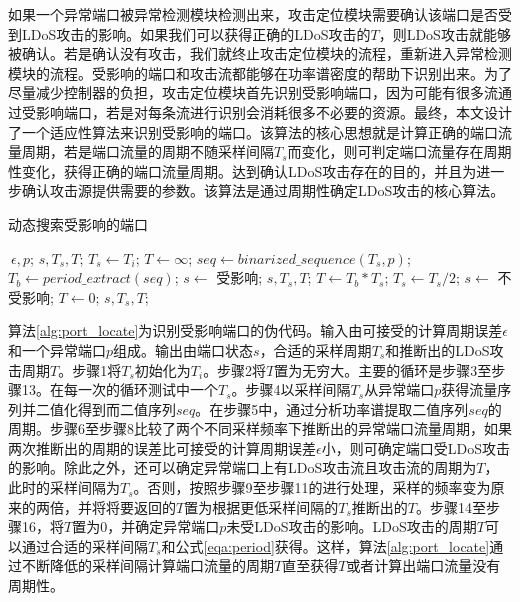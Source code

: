如果一个异常端口被异常检测模块检测出来，攻击定位模块需要确认该端口是否受到LDoS攻击的影响。如果我们可以获得正确的LDoS攻击的$T$，则LDoS攻击就能够被确认。若是确认没有攻击，我们就终止攻击定位模块的流程，重新进入异常检测模块的流程。受影响的端口和攻击流都能够在功率谱密度的帮助下识别出来。为了尽量减少控制器的负担，攻击定位模块首先识别受影响端口，因为可能有很多流通过受影响端口，若是对每条流进行识别会消耗很多不必要的资源。最终，本文设计了一个适应性算法来识别受影响的端口。该算法的核心思想就是计算正确的端口流量周期，若是端口流量的周期不随采样间隔$T_s$而变化，则可判定端口流量存在周期性变化，获得正确的端口流量周期。达到确认LDoS攻击存在的目的，并且为进一步确认攻击源提供需要的参数。该算法是通过周期性确定LDoS攻击的核心算法。

\begin{algorithm}[H]
	\caption{动态搜索受影响的端口}
	\label{alg:port_locate}
	\begin{algorithmic}[1]
		\Require $~{\epsilon}, p$;
		\Ensure $s, T_s, T$;
		\State $T_s \gets T_i$;
		\State $T \gets \infty$; 
		\State $seq \gets binarized\_sequence(T_s, p)$;
		\State $T_b \gets period\_extract(seq)$;
		\State $s \gets$ 受影响;
		\State \Return $s, T_s, T$;
		\Else
		\State $T \gets T_b * T_s$;
		\State $T_s \gets T_s / 2$;
		\EndIf 
		\EndWhile
		\State $s \gets$ 不受影响;
		\State $T \gets 0$; 
		\State \Return $s, T_s, T$;
	\end{algorithmic}
\end{algorithm}

算法\ref{alg:port_locate}为识别受影响端口的伪代码。输入由可接受的计算周期误差$\epsilon$和一个异常端口$p$组成。输出由端口状态$s$，合适的采样周期$T_s$和推断出的LDoS攻击周期$T$。步骤1将$T_s$初始化为$T_i$。步骤2将$T$置为无穷大。主要的循环是步骤3至步骤13。在每一次的循环测试中一个$T_s$。步骤4以采样间隔$T_s$从异常端口$p$获得流量序列并二值化得到而二值序列$seq$。在步骤5中，通过分析功率谱提取二值序列$seq$的周期。步骤6至步骤8比较了两个不同采样频率下推断出的异常端口流量周期，如果两次推断出的周期的误差比可接受的计算周期误差$\epsilon$小，则可确定端口受LDoS攻击的影响。除此之外，还可以确定异常端口上有LDoS攻击流且攻击流的周期为$T$，此时的采样间隔为$T_s$。否则，按照步骤9至步骤11的进行处理，采样的频率变为原来的两倍，并将将要返回的$T$置为根据更低采样间隔的$T_s$推断出的$T$。步骤14至步骤16，将$T$置为0，并确定异常端口$p$未受LDoS攻击的影响。LDoS攻击的周期$T$可以通过合适的采样间隔$T_s$和公式\ref{eqa:period}获得。这样，算法\ref{alg:port_locate}通过不断降低的采样间隔计算端口流量的周期$T$直至获得$T$或者计算出端口流量没有周期性。

